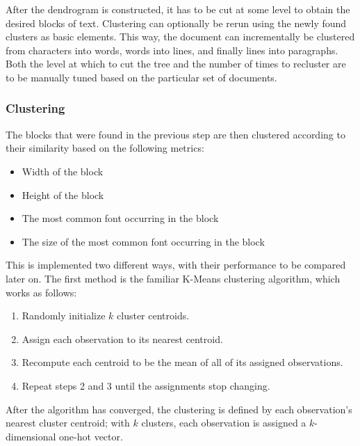 After the dendrogram is constructed, it has to be cut at some level to obtain
the desired blocks of text. Clustering can optionally be rerun using the newly
found clusters as basic elements. This way, the document can incrementally be
clustered from characters into words, words into lines, and finally lines into
paragraphs. Both the level at which to cut the tree and the number of times to
recluster are to be manually tuned based on the particular set of documents.

\subsubsection{Clustering}
The blocks that were found in the previous step are then clustered according to
their similarity based on the following metrics:
\begin{itemize}
  \item Width of the block
  \item Height of the block
  \item The most common font occurring in the block
  \item The size of the most common font occurring in the block
\end{itemize}
This is implemented two different ways, with their performance to be compared
later on. The first method is the familiar K-Means clustering algorithm, which works
as follows:
\begin{enumerate}
  \item Randomly initialize $k$ cluster centroids.
  \item Assign each observation to its nearest centroid.
  \item Recompute each centroid to be the mean of all of its assigned
    observations.
  \item Repeat steps 2 and 3 until the assignments stop changing.
\end{enumerate}
After the algorithm has converged, the clustering is defined by each
observation's nearest cluster centroid; with $k$ clusters, each observation is
assigned a $k$-dimensional one-hot vector.

